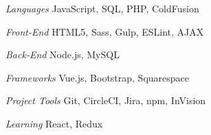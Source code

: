 \begin{minipage}[t]{0.53\textwidth}
\begin{cvskills}

  \cvskill
    {\textit{Languages}} %
    {JavaScript, SQL, PHP, ColdFusion} %


 \cvskill
    {\textit{Front-End}} %
    {HTML5, Sass, Gulp, ESLint, AJAX} %


  \cvskill
    {\textit{Back-End}} %
    {Node.js, MySQL} %

 
\end{cvskills}
\end{minipage}%
\begin{minipage}[t]{0.47\textwidth}
\begin{cvskills}

  \cvskill
    {\textit{Frameworks}} %
    {Vue.js, Bootstrap, Squarespace} %


  \cvskill
    {\textit{Project Tools}} %
    {Git, CircleCI, Jira, npm, InVision} %


  \cvskill
    {\textit{Learning}} %
    {React, Redux} %

\end{cvskills}
\end{minipage}

%
